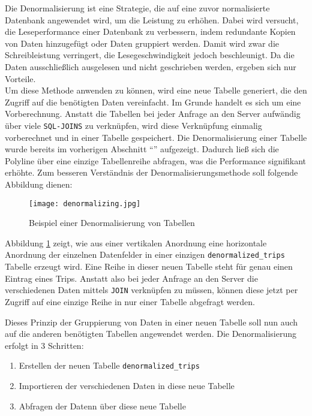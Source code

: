     Die Denormalisierung ist eine Strategie, die auf eine zuvor normalisierte Datenbank angewendet wird, um die Leistung zu erhöhen. Dabei wird versucht, die Leseperformance einer Datenbank zu verbessern, indem redundante Kopien von Daten hinzugefügt oder Daten gruppiert werden. Damit wird zwar die Schreibleistung verringert, die Lesegeschwindigkeit jedoch beschleunigt.\parencite{sanders}
    Da die Daten ausschließlich ausgelesen und nicht geschrieben werden, ergeben sich nur Vorteile.\\

    Um diese Methode anwenden zu können, wird eine neue Tabelle generiert, die den Zugriff auf die benötigten Daten vereinfacht. Im Grunde handelt es sich um eine Vorberechnung. Anstatt die Tabellen bei jeder Anfrage an den Server aufwändig über viele \texttt{SQL-JOINS} zu verknüpfen, wird diese Verknüpfung einmalig vorberechnet und in einer Tabelle gespeichert. Die Denormalisierung einer Tabelle wurde bereits im vorherigen Abschnitt "`"' aufgezeigt. Dadurch ließ sich die Polyline über eine einzige Tabellenreihe abfragen, was die Performance signifikant erhöhte. Zum besseren Verständnis der Denormalisierungsmethode soll folgende Abbildung dienen:

    \begin{figure}[htbp]
      \begin{center}
        \texttt{[image: denormalizing.jpg]}
        \caption{Beispiel einer Denormalisierung von Tabellen}
        \label{fig:denormalizing}
      \end{center}
    \end{figure}

    Abbildung \ref{fig:denormalizing} zeigt, wie aus einer vertikalen Anordnung eine horizontale Anordnung der einzelnen Datenfelder in einer einzigen \texttt{denormalized\_trips} Tabelle erzeugt wird. Eine Reihe in dieser neuen Tabelle steht für genau einen Eintrag eines Trips. Anstatt also bei jeder Anfrage an den Server die verschiedenen Daten mittels \texttt{JOIN} verknüpfen zu müssen, können diese jetzt per Zugriff auf eine einzige Reihe in nur einer Tabelle abgefragt werden.

    Dieses Prinzip der Gruppierung von Daten in einer neuen Tabelle soll nun auch auf die anderen benötigten Tabellen angewendet werden. Die Denormalisierung erfolgt in 3 Schritten:

    \begin{enumerate}
      \item Erstellen der neuen Tabelle \texttt{denormalized\_trips}
      \item Importieren der verschiedenen Daten in diese neue Tabelle
      \item Abfragen der Datenn über diese neue Tabelle
    \end{enumerate}


